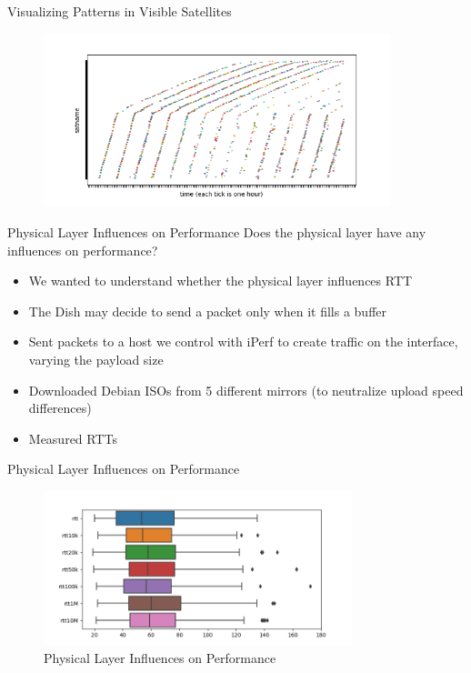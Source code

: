 \documentclass[NET,english,beameralt]{tumbeamer}
\begin{document}
\begin{frame}{Visualizing Patterns in Visible Satellites}
    \begin{figure}
        \includegraphics[width=0.9\textwidth]{pics/patterns-in-satellite-appearances.png}
    \end{figure}
\end{frame}

\begin{frame}{Physical Layer Influences on Performance}
    Does the physical layer have any influences on performance? 
    \begin{itemize}
        \item We wanted to understand whether the physical layer influences RTT
        \item The Dish may decide to send a packet only when it fills a buffer
        \item Sent packets to a host we control with iPerf to create traffic on the interface, varying the payload size
        \item Downloaded Debian ISOs from 5 different mirrors (to neutralize upload speed differences)
        \item Measured RTTs 
    \end{itemize}
\end{frame}

\begin{frame}{{Physical Layer Influences on Performance}}
    \begin{figure}
        \includegraphics[width=0.8\textwidth]{pics/rtt-iperf-stress.png}
        \caption{Physical Layer Influences on Performance}
    \end{figure}
\end{frame}
\end{document}
